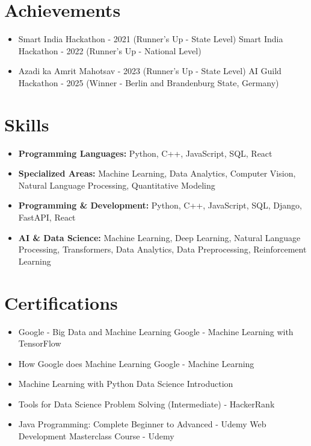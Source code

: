 \documentclass[a4paper,10pt]{article}
\begin{document}
\section*{Achievements}
\begin{itemize}
\item Smart India Hackathon - 2021 (Runner's Up - State Level) \hfill Smart India Hackathon - 2022 (Runner's Up - National Level)
\item Azadi ka Amrit Mahotsav - 2023 (Runner's Up - State Level) \hfill AI Guild Hackathon - 2025 (Winner - Berlin and Brandenburg State, Germany)
\end{itemize}

\section*{Skills}
\begin{itemize}
  \item \textbf{Programming Languages:} Python, C++, JavaScript, SQL, React
  \item \textbf{Specialized Areas:} Machine Learning, Data Analytics, Computer Vision, Natural Language Processing, Quantitative Modeling
  \item \textbf{Programming \& Development:} Python, C++, JavaScript, SQL, Django, FastAPI, React
  \item \textbf{AI \& Data Science:} Machine Learning, Deep Learning, Natural Language Processing, Transformers, Data Analytics, Data Preprocessing, Reinforcement Learning
\end{itemize}

\section*{Certifications}
\begin{itemize}
\item Google - Big Data and Machine Learning \hfill Google - Machine Learning with TensorFlow
\item How Google does Machine Learning \hfill Google - Machine Learning
\item Machine Learning with Python \hfill Data Science Introduction
\item Tools for Data Science \hfill Problem Solving (Intermediate) - HackerRank
\item Java Programming: Complete Beginner to Advanced - Udemy \hfill Web Development Masterclass Course - Udemy
\end{itemize}
\end{document}
